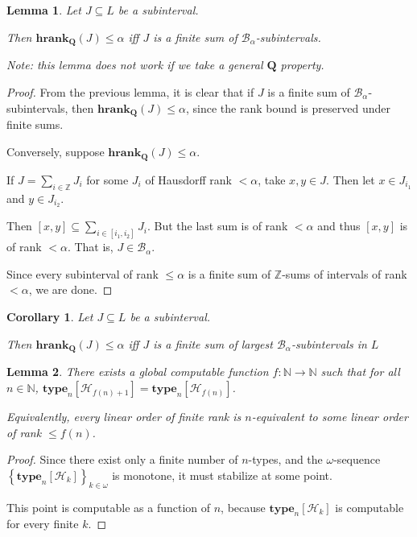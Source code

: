 \documentclass{article}
\newtheorem{corollary}{Corollary}
\newtheorem{lemma}{Lemma}
\newcommand{\brackets}[1]{\left[ {#1} \right]}
\newcommand{\braces}[1]{\left\{ {#1} \right\}}
\newcommand{\hrank}[1]{\mathbf{hrank}_{\qq}\left( #1 \right)}
\newcommand{\qq}{\mathbf{Q}}
\newcommand{\NN}{\mathbb{N}}
\newcommand{\ZZ}{\mathbb{Z}}
\newcommand{\type}[2]{\mathbf{type}_{#1} \brackets{#2}}
\begin{document}
\begin{lemma}
  Let $J \subseteq L$ be a subinterval.

  Then $\hrank{J} \le \alpha$ iff $J$ is a finite sum of $\mathcal{B}_{\alpha}$-subintervals.

  Note: this lemma does not work if we take a general $\qq$ property.
\end{lemma}

\begin{proof}
  From the previous lemma, it is clear that if $J$ is a finite sum of $\mathcal{B}_{\alpha}$-subintervals,
  then $\hrank{J} \le \alpha$, since the rank bound is preserved under finite sums.

  Conversely, suppose $\hrank{J} \le \alpha$.

  If $J = \sum_{i \in \ZZ} J_i$ for some $J_i$ of Hausdorff rank $< \alpha$,
  take $x, y \in J$. Then let $x \in J_{i_1}$ and $y \in J_{i_2}$.

  Then $[x, y] \subseteq \sum_{i \in [i_1, i_2]} J_i$. But the last sum is of rank $< \alpha$
  and thus $[x, y]$ is of rank $< \alpha$. That is, $J \in \mathcal{B}_{\alpha}$.

  Since every subinterval of rank $\le \alpha$ is a finite sum of $\ZZ$-sums of intervals of rank $< \alpha$,
  we are done.
\end{proof}

\begin{corollary}
  Let $J \subseteq L$ be a subinterval.

  Then $\hrank{J} \le \alpha$ iff $J$ is a finite sum of largest $\mathcal{B}_{\alpha}$-subintervals in $L$
\end{corollary}

\begin{lemma}
  There exists a global computable function $f : \NN \to \NN$ such that
  for all $n \in \NN$,
  $\type{n}{\mathcal{H}_{f(n) + 1}} = \type{n}{\mathcal{H}_{f(n)}}$.

  Equivalently, every linear order of finite rank is $n$-equivalent to some linear order of rank $\le f(n)$.
\end{lemma}

\begin{proof}
  Since there exist only a finite number of $n$-types,
  and the $\omega$-sequence $\braces{\type{n}{\mathcal{H}_{k}}}_{k \in \omega}$ is monotone,
  it must stabilize at some point.

  This point is computable as a function of $n$, because
  $\type{n}{\mathcal{H}_{k}}$ is computable for every finite $k$.
\end{proof}
\end{document}
